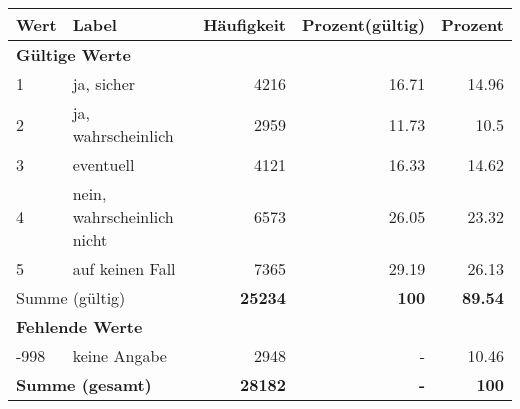      \begin{longtable}{lXrrr}
     \toprule
     \textbf{Wert} & \textbf{Label} & \textbf{Häufigkeit} & \textbf{Prozent(gültig)} & \textbf{Prozent} \\
     \endhead
     \midrule
     \multicolumn{5}{l}{\textbf{Gültige Werte}}\\

     1 &
     \multicolumn{1}{X}{ ja, sicher   } &


       \num{4216} &
       \num[round-mode=places,round-precision=2]{16,71} &
         \num[round-mode=places,round-precision=2]{14,96} \\

     2 &
     \multicolumn{1}{X}{ ja, wahrscheinlich   } &


       \num{2959} &
       \num[round-mode=places,round-precision=2]{11,73} &
         \num[round-mode=places,round-precision=2]{10,5} \\

     3 &
     \multicolumn{1}{X}{ eventuell   } &


       \num{4121} &
       \num[round-mode=places,round-precision=2]{16,33} &
         \num[round-mode=places,round-precision=2]{14,62} \\

     4 &
     \multicolumn{1}{X}{ nein, wahrscheinlich nicht   } &


       \num{6573} &
       \num[round-mode=places,round-precision=2]{26,05} &
         \num[round-mode=places,round-precision=2]{23,32} \\

     5 &
     \multicolumn{1}{X}{ auf keinen Fall   } &


       \num{7365} &
       \num[round-mode=places,round-precision=2]{29,19} &
         \num[round-mode=places,round-precision=2]{26,13} \\
     \midrule
     \multicolumn{2}{l}{Summe (gültig)} &
       \textbf{\num{25234}} &
     \textbf{100} &
       \textbf{\num[round-mode=places,round-precision=2]{89,54}} \\
     \multicolumn{5}{l}{\textbf{Fehlende Werte}}\\
       -998 &
       keine Angabe &
         \num{2948} &
        - &
         \num[round-mode=places,round-precision=2]{10,46} \\
     \midrule
     \multicolumn{2}{l}{\textbf{Summe (gesamt)}} &
          \textbf{\num{28182}} &
        \textbf{-} &
        \textbf{100} \\
     \bottomrule
     \end{longtable}
     
